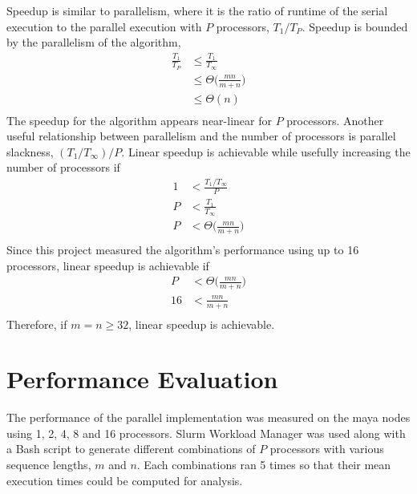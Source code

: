 \documentclass[usletter, 11pt]{extarticle}
\begin{document}
        Speedup is similar to parallelism, where it is the ratio of runtime of
        the serial execution to the parallel execution with $P$ processors,
        $T_1/T_P$. Speedup is bounded by the parallelism of the algorithm,
        \begin{equation*}
            \begin{split}
                \frac{T_1}{T_P} & \le \frac{T_1}{T_\infty} \\
                & \le \Theta\Bigg(\frac{mn}{m+n}\Bigg) \\
                & \le \Theta(n) \\
            \end{split}
        \end{equation*}
        The speedup for the algorithm appears near-linear for $P$ processors.
        \newpage
        Another useful relationship between parallelism and the number of
        processors is parallel slackness, $(T_1/T_\infty)/P$. Linear speedup is
        achievable while usefully increasing the number of processors if
        \begin{equation*}
            \begin{split}
                1 & < \frac{T_1/T_\infty}{P} \\
                P & < \frac{T_1}{T_\infty} \\
                P & < \Theta\Bigg(\frac{mn}{m+n}\Bigg) \\
            \end{split}
        \end{equation*}
        Since this project measured the algorithm's performance using up to 16
        processors, linear speedup is achievable if
        \begin{equation*}
            \begin{split}
                P & < \Theta\Bigg(\frac{mn}{m+n}\Bigg) \\
                16 & < \frac{mn}{m+n} \\
            \end{split}
        \end{equation*}
        Therefore, if $m=n\ge32$, linear speedup is achievable.

    \section{Performance Evaluation} The performance of the parallel
    implementation was measured on the maya nodes using 1, 2, 4, 8 and 16
    processors. Slurm Workload Manager was used along with a Bash script to
    generate different combinations of $P$ processors with various sequence
    lengths, $m$ and $n$. Each combinations ran 5 times so that their mean
    execution times could be computed for analysis.
\end{document}
